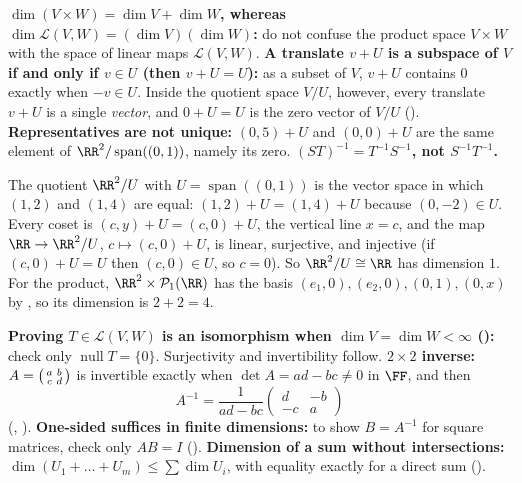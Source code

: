 \documentclass[10pt]{scrartcl}
\DeclareMathOperator{\spn}{span}\DeclareMathOperator{\nul}{null}\DeclareMathOperator{\range}{range}
\newcommand{\PP}{\mathcal P}\newcommand{\LL}{\mathcal L}\newcommand{\MM}{\mathcal M}
\begin{document}
\begin{trapbox}
  \ii \textbf{$\dim(V\times W)=\dim V+\dim W$, whereas $\dim\LL(V,W)=(\dim V)(\dim W)$:} do not confuse the product space $V\times W$ with the space of linear maps $\LL(V,W)$.
  \ii \textbf{A translate $v+U$ is a subspace of $V$ if and only if $v\in U$ (then $v+U=U$):} as a subset of $V$, $v+U$ contains $0$ exactly when $-v\in U$. Inside the quotient space $V/U$, however, every translate $v+U$ is a single \emph{vector}, and $0+U=U$ is the zero vector of $V/U$ ().
  \ii \textbf{Representatives are not unique:} $(0,5)+U$ and $(0,0)+U$ are the same element of $\RR^2/\spn((0,1))$, namely its zero.
  \ii \textbf{$(ST)^{-1}=T^{-1}S^{-1}$, not $S^{-1}T^{-1}$.}
\end{trapbox}

\revisit The quotient $\RR^2/U$ with $U=\spn((0,1))$ is the vector space in which $(1,2)$ and $(1,4)$ are equal: $(1,2)+U=(1,4)+U$ because $(0,-2)\in U$. Every coset is $(c,y)+U=(c,0)+U$, the vertical line $x=c$, and the map $\RR\to\RR^2/U$, $c\mapsto(c,0)+U$, is linear, surjective, and injective (if $(c,0)+U=U$ then $(c,0)\in U$, so $c=0$). So $\RR^2/U\cong\RR$ has dimension $1$. For the product, $\RR^2\times\PP_1(\RR)$ has the basis $(e_1,0),(e_2,0),(0,1),(0,x)$ by , so its dimension is $2+2=4$.

\begin{shortcuts}
  \ii \textbf{Proving $T\in\LL(V,W)$ is an isomorphism when $\dim V=\dim W<\infty$ ():} check only $\nul T=\{0\}$. Surjectivity and invertibility follow.
  \ii \textbf{$2\times 2$ inverse:} $A=\begin{psmallmatrix}a&b\\c&d\end{psmallmatrix}$ is invertible exactly when $\det A=ad-bc\ne 0$ in $\FF$, and then
  \[
    A^{-1}=\frac{1}{ad-bc}\begin{pmatrix}d&-b\\-c&a\end{pmatrix}
  \]
  (, ).
  \ii \textbf{One-sided suffices in finite dimensions:} to show $B=A^{-1}$ for square matrices, check only $AB=I$ ().
  \ii \textbf{Dimension of a sum without intersections:} $\dim(U_1+\dots+U_m)\le\sum\dim U_i$, with equality exactly for a direct sum ().
\end{shortcuts}
\end{document}
